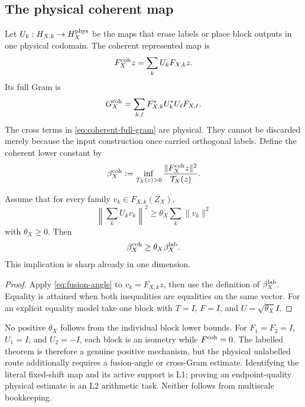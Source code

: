 \subsection{The physical coherent map}
Let \(U_k:H_{X,k}\to H_X^{\rm phys}\) be the maps that erase labels or place
block outputs in one physical codomain. The coherent represented map is
\[
 F_X^{\rm coh}z=\sum_kU_kF_{X,k}z.
\]
Its full Gram is
\begin{equation}\label{eq:coherent-full-gram}
 G_X^{\rm coh}
 =\sum_{k,\ell}F_{X,k}^*U_k^*U_\ell F_{X,\ell}.
\end{equation}
The cross terms in \eqref{eq:coherent-full-gram} are physical. They cannot be
discarded merely because the input construction once carried orthogonal
labels.
Define the coherent lower constant by
\begin{equation}\label{eq:coherent-beta-definition}
 \beta_X^{\rm coh}
 :=\inf_{\mathcal T_X(z)>0}
 \frac{\|F_X^{\rm coh}z\|^2}{\mathcal T_X(z)}.
\end{equation}

\begin{proposition}\label{prop:fusion-angle}
Assume that for every family \(v_k\in F_{X,k}(Z_X)\),
\begin{equation}\label{eq:fusion-angle}
 \left\|\sum_kU_kv_k\right\|^2
 \ge\theta_X\sum_k\|v_k\|^2
\end{equation}
with \(\theta_X\ge0\). Then
\[
 \beta_X^{\rm coh}\ge\theta_X\beta_X^{\rm lab}.
\]
This implication is sharp already in one dimension.
\end{proposition}

\begin{proof}
Apply \eqref{eq:fusion-angle} to \(v_k=F_{X,k}z\), then use the definition of
\(\beta_X^{\rm lab}\). Equality is attained when both inequalities are
equalities on the same vector. For an explicit equality model take one block
with \(T=I\), \(F=I\), and \(U=\sqrt{\theta_X}I\).
\end{proof}

No positive \(\theta_X\) follows from the individual block lower bounds. For
\(F_1=F_2=I\), \(U_1=I\), and \(U_2=-I\), each block is an isometry while
\(F^{\rm coh}=0\). The labelled theorem is therefore a genuine positive
mechanism, but the physical unlabelled route additionally requires a
fusion-angle or cross-Gram estimate. Identifying the literal fixed-shift map
and its active support is L1; proving an endpoint-quality physical estimate is
an L2 arithmetic task. Neither follows from multiscale bookkeeping.
